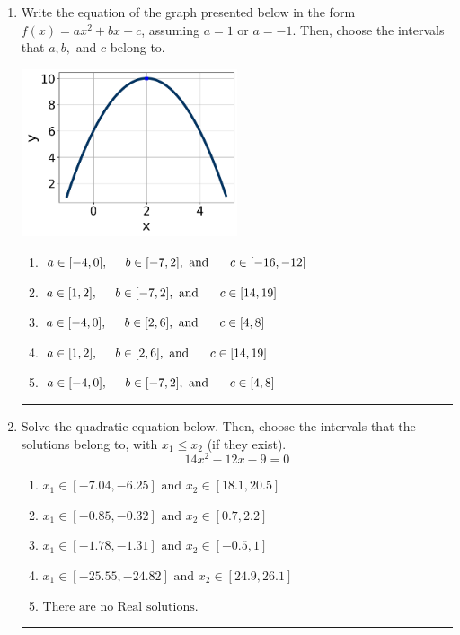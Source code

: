 \documentclass[14pt]{extbook}
\newcommand{\litem}[1]{\item#1\hspace*{-1cm}\rule{\textwidth}{0.4pt}}
\begin{document}
\begin{enumerate}
{\begin{enumerate}[label=\Alph*.]
\end{enumerate} }
\litem{
Write the equation of the graph presented below in the form $f(x)=ax^2+bx+c$, assuming  $a=1$ or $a=-1$. Then, choose the intervals that $a, b,$ and $c$ belong to.
\begin{center}
    \includegraphics[width=0.5\textwidth]{../Figures/quadraticGraphToEquationCopyC.png}
\end{center}
\begin{enumerate}[label=\Alph*.]
\item \( a \in [-4, 0], \hspace*{5mm} b \in [-7, 2], \text{ and } \hspace*{5mm} c \in [-16, -12] \)
\item \( a \in [1, 2], \hspace*{5mm} b \in [-7, 2], \text{ and } \hspace*{5mm} c \in [14, 19] \)
\item \( a \in [-4, 0], \hspace*{5mm} b \in [2, 6], \text{ and } \hspace*{5mm} c \in [4, 8] \)
\item \( a \in [1, 2], \hspace*{5mm} b \in [2, 6], \text{ and } \hspace*{5mm} c \in [14, 19] \)
\item \( a \in [-4, 0], \hspace*{5mm} b \in [-7, 2], \text{ and } \hspace*{5mm} c \in [4, 8] \)

\end{enumerate} }
\litem{
Solve the quadratic equation below. Then, choose the intervals that the solutions belong to, with $x_1 \leq x_2$ (if they exist).\[ 14x^{2} -12 x -9 = 0 \]\begin{enumerate}[label=\Alph*.]
\item \( x_1 \in [-7.04, -6.25] \text{ and } x_2 \in [18.1, 20.5] \)
\item \( x_1 \in [-0.85, -0.32] \text{ and } x_2 \in [0.7, 2.2] \)
\item \( x_1 \in [-1.78, -1.31] \text{ and } x_2 \in [-0.5, 1] \)
\item \( x_1 \in [-25.55, -24.82] \text{ and } x_2 \in [24.9, 26.1] \)
\item \( \text{There are no Real solutions.} \)


\end{enumerate}}
\end{enumerate}
\end{document}
